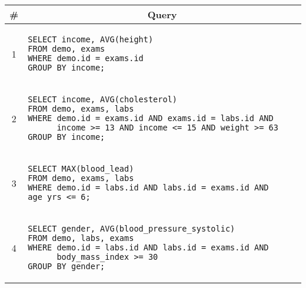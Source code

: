 \begin{tabular}{cl}
\toprule
\# & \multicolumn{1}{c}{Query} \\
\midrule
1 & 
\begin{minipage}{6in}
\begin{lstlisting}[breaklines]
SELECT income, AVG(height)
FROM demo, exams
WHERE demo.id = exams.id
GROUP BY income;
\end{lstlisting}
\end{minipage}{queryno} \label{q1} \\
2 & 
\begin{minipage}{6in}
\begin{lstlisting}[breaklines]
SELECT income, AVG(cholesterol)
FROM demo, exams, labs
WHERE demo.id = exams.id AND exams.id = labs.id AND
      income >= 13 AND income <= 15 AND weight >= 63
GROUP BY income;
\end{lstlisting}
\end{minipage}
{queryno} \label{q2} \\
3 & 
\begin{minipage}{6in}
\begin{lstlisting}[breaklines]
SELECT MAX(blood_lead)
FROM demo, exams, labs
WHERE demo.id = labs.id AND labs.id = exams.id AND age_yrs <= 6;
\end{lstlisting}
\end{minipage}{queryno} \label{q3}\\
4 & 
\begin{minipage}{6in}
\begin{lstlisting}[breaklines]
SELECT gender, AVG(blood_pressure_systolic)
FROM demo, labs, exams
WHERE demo.id = labs.id AND labs.id = exams.id AND
      body_mass_index >= 30
GROUP BY gender;
\end{lstlisting}
\end{minipage}{queryno} \label{q4}\\
\bottomrule
\end{tabular}
